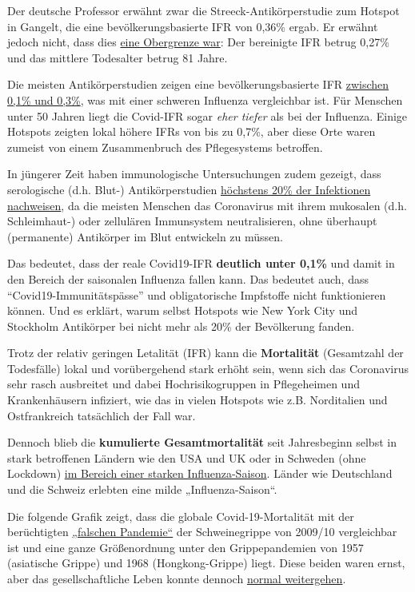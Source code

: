 Der deutsche Professor erwähnt zwar die Streeck-Antikörperstudie zum
Hotspot in Gangelt, die eine bevölkerungsbasierte IFR von 0,36\% ergab.
Er erwähnt jedoch nicht, dass dies
\href{https://swprs.org/studies-on-covid-19-lethality/}{eine Obergrenze
war}: Der bereinigte IFR betrug 0,27\% und das mittlere Todesalter
betrug 81 Jahre.

Die meisten Antikörperstudien zeigen eine bevölkerungsbasierte IFR
\href{https://swprs.org/studies-on-covid-19-lethality/}{zwischen 0,1\%
und 0,3\%}, was mit einer schweren Influenza vergleichbar ist. Für
Menschen unter 50 Jahren liegt die Covid-IFR sogar \emph{eher tiefer}
als bei der Influenza. Einige Hotspots zeigten lokal höhere IFRs von bis
zu 0,7\%, aber diese Orte waren zumeist von einem Zusammenbruch des
Pflegesystems betroffen.

In jüngerer Zeit haben immunologische Untersuchungen zudem gezeigt, dass
serologische (d.h. Blut-) Antikörperstudien
\href{https://swprs.org/coronavirus-antibody-tests-show-only-one-fifth-of-infections/}{höchstens
20\% der Infektionen nachweisen}, da die meisten Menschen das
Coronavirus mit ihrem mukosalen (d.h. Schleimhaut-) oder zellulären
Immunsystem neutralisieren, ohne überhaupt (permanente) Antikörper im
Blut entwickeln zu müssen.

Das bedeutet, dass der reale Covid19-IFR \textbf{deutlich unter 0,1\%}
und damit in den Bereich der saisonalen Influenza fallen kann. Das
bedeutet auch, dass ``Covid19-Immunitätspässe'' und obligatorische
Impfstoffe nicht funktionieren können. Und es erklärt, warum selbst
Hotspots wie New York City und Stockholm Antikörper bei nicht mehr als
20\% der Bevölkerung fanden.

Trotz der relativ geringen Letalität (IFR) kann die \textbf{Mortalität}
(Gesamtzahl der Todesfälle) lokal und vorübergehend stark erhöht sein,
wenn sich das Coronavirus sehr rasch ausbreitet und dabei
Hoch­risiko­gruppen in Pflegeheimen und Krankenhäusern infiziert, wie
das in vielen Hotspots wie z.B. Norditalien und Ostfrankreich
tatsächlich der Fall war.

Dennoch blieb die \textbf{kumulierte Gesamtmortalität} seit Jahresbeginn
selbst in stark betroffenen Ländern wie den USA und UK oder in Schweden
(ohne Lockdown)
\href{https://swprs.org/studies-on-covid-19-lethality/\#overall-mortality}{im
Bereich einer starken Influenza-Saison}. Länder wie Deutschland und die
Schweiz erlebten eine milde „Influenza-Saison``.

Die folgende Grafik zeigt, dass die globale Covid-19-Mortalität mit der
berüchtigten
\href{https://www.forbes.com/2010/02/05/world-health-organization-swine-flu-pandemic-opinions-contributors-michael-fumento.html}{„falschen
Pandemie``} der Schweinegrippe von 2009/10 vergleichbar ist und eine
ganze Größen­ordnung unter den Grippepandemien von 1957 (asiatische
Grippe) und 1968 (Hongkong-Grippe) liegt. Diese beiden waren ernst, aber
das gesellschaftliche Leben konnte dennoch
\href{https://nypost.com/2020/05/16/why-life-went-on-as-normal-during-the-killer-pandemic-of-1969/}{normal
weitergehen}.

